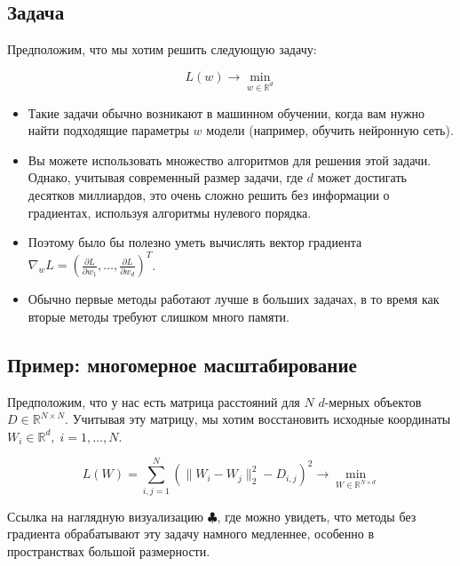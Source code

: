 \documentclass[
  russian,
  letterpaper,
  DIV=11,
  numbers=noendperiod]{scrartcl}
\providecommand{\tightlist}{%
  \setlength{\itemsep}{0pt}\setlength{\parskip}{0pt}}
\begin{document}
\subsection{Задача}\label{ux437ux430ux434ux430ux447ux430}

Предположим, что мы хотим решить следующую задачу:

\[
L(w) \to \min_{w \in \mathbb{R}^d}
\]

\begin{itemize}
\tightlist
\item
  Такие задачи обычно возникают в машинном обучении, когда вам нужно
  найти подходящие параметры \(w\) модели (например, обучить нейронную
  сеть).
\item
  Вы можете использовать множество алгоритмов для решения этой задачи.
  Однако, учитывая современный размер задачи, где \(d\) может достигать
  десятков миллиардов, это очень сложно решить без информации о
  градиентах, используя алгоритмы нулевого порядка.
\item
  Поэтому было бы полезно уметь вычислять вектор градиента
  \(\nabla_w L = \left( \frac{\partial L}{\partial w_1}, \ldots, \frac{\partial L}{\partial w_d}\right)^T\).
\item
  Обычно первые методы работают лучше в больших задачах, в то время как
  вторые методы требуют слишком много памяти.
\end{itemize}

\subsection{Пример: многомерное
масштабирование}\label{ux43fux440ux438ux43cux435ux440-ux43cux43dux43eux433ux43eux43cux435ux440ux43dux43eux435-ux43cux430ux441ux448ux442ux430ux431ux438ux440ux43eux432ux430ux43dux438ux435}

Предположим, что у нас есть матрица расстояний для \(N\) \(d\)-мерных
объектов \(D \in \mathbb{R}^{N \times N}\). Учитывая эту матрицу, мы
хотим восстановить исходные координаты
\(W_i \in \mathbb{R}^d, \; i = 1, \ldots, N\).

\[
L(W) = \sum_{i, j = 1}^N \left(\|W_i - W_j\|^2_2 - D_{i,j}\right)^2 \to \min_{W \in \mathbb{R}^{N \times d}}
\]

Ссылка на наглядную визуализацию
\href{http://www.benfrederickson.com/numerical-optimization/}{\(\clubsuit\)},
где можно увидеть, что методы без градиента обрабатывают эту задачу
намного медленнее, особенно в пространствах большой размерности.
\end{document}
